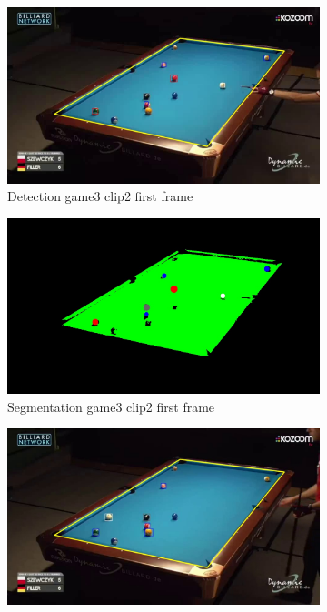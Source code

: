 \begin{figure}[H]
    \centering
    \begin{subfigure}[b]{0.35\textwidth}
        \centering
        \includegraphics[width=\textwidth]{images/Detection/game3_clip2_detected_balls_first_frame.jpg}
        \caption{Detection game3 clip2 first frame}
        \label{fig: game3_clip2_first_frame_detected}
    \end{subfigure}
    \begin{subfigure}[b]{0.35\textwidth}
        \centering
        \includegraphics[width=\textwidth]{images/Segmentation/game3_clip2_segmented_balls_first_frame.jpg}
        \caption{Segmentation game3 clip2 first frame}
		\label{fig: game3_clip2_first_frame_segmented}
    \end{subfigure}
    \begin{subfigure}[b]{0.35\textwidth}
        \centering
        \includegraphics[width=\textwidth]{images/Detection/game3_clip2_detected_balls_last_frame.jpg}

\end{subfigure}
\end{figure}
